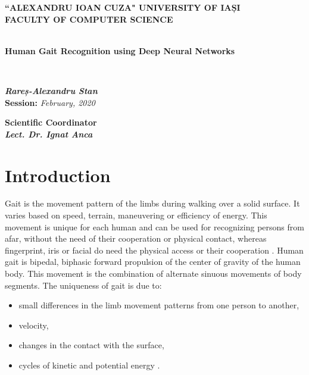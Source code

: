 \documentclass[12pt]{article}
\theoremstyle{definition}
\begin{document}
	\begin{titlepage}
		\begin{center}
			\textbf{``ALEXANDRU IOAN CUZA" UNIVERSITY OF IAȘI}
			\
			\\
			\textbf{FACULTY OF COMPUTER SCIENCE}\\
			\vspace{6cm}
			\
			\\
			\begin{huge}
				\textbf{Human Gait Recognition using Deep Neural Networks}
			\end{huge}
			\\
			\begin{large}
				\vspace{3cm}
				\textit{\textbf{Rareș-Alexandru Stan}}
				\\
				\vspace{3cm}
				\textbf{Session:} \textit{February, 2020}
				\\
			\end{large}
			\vspace{3cm}
			\textbf{Scientific Coordinator}
			\
			\\
			\textit{\textbf{Lect. Dr. Ignat Anca}	}
		\end{center}
	\end{titlepage}

	\clearpage
	\tableofcontents
	\clearpage

	\section{Introduction}
	\vspace{1cm}

	Gait is the movement pattern of the limbs during walking over a solid surface. It varies based on speed, terrain, maneuvering or efficiency of energy. This movement is unique for each human and can be used for recognizing persons from afar, without the need of their cooperation or physical contact, whereas fingerprint, iris or facial do need the physical access or their cooperation \cite{biometrics-comparison}. Human gait is bipedal, biphasic forward propulsion of the center of gravity of the human body. This movement is the combination of alternate sinuous movements of body segments. The uniqueness of gait is due to:
	\begin{itemize}
		\item small differences in the limb movement patterns from one person to another,
		\item velocity,
		\item changes in the contact with the surface,
		\item cycles of kinetic and potential energy \cite{gait-biomecanics}.
	\end{itemize}
\end{document}

